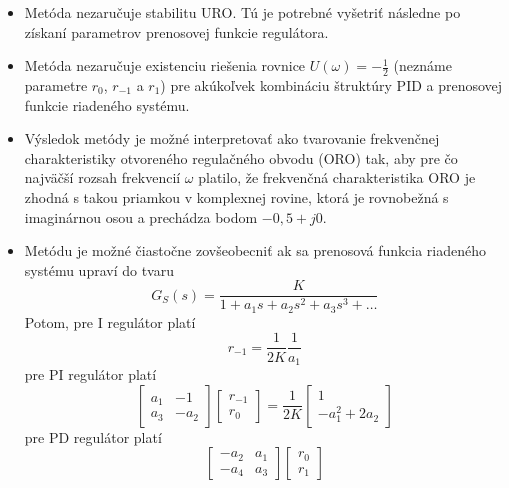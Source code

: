 \documentclass[a4paper, 10pt, ]{article}
\begin{document}
\begin{itemize}[leftmargin=0pt, labelsep=3mm, itemsep=0pt]
    \item Metóda nezaručuje stabilitu URO. Tú je potrebné vyšetriť následne po získaní parametrov prenosovej funkcie regulátora.
    \item Metóda nezaručuje existenciu riešenia rovnice $U(\omega) = -\frac{1}{2}$ (neznáme parametre  $r_0$, $r_{-1}$ a $r_1$) pre akúkoľvek kombináciu štruktúry PID a prenosovej funkcie riadeného systému.
    \item Výsledok metódy je možné interpretovať ako tvarovanie frekvenčnej charakteristiky otvoreného regulačného obvodu (ORO) tak, aby pre čo najväčší rozsah frekvencií $\omega$ platilo, že frekvenčná charakteristika ORO je zhodná s takou priamkou v komplexnej rovine, ktorá je rovnobežná s imaginárnou osou a prechádza bodom $-0,5 + j0$.
    \item Metódu je možné čiastočne zovšeobecniť ak sa prenosová funkcia riadeného systému upraví do tvaru
    \begin{equation}
        G_S(s) = \frac{K}{1 + a_1s + a_2s^2 + a_3s^3 + \ldots}
    \end{equation}
    Potom, pre I regulátor platí
    \begin{equation}
        r_{-1} = \frac{1}{2K} \frac{1}{a_1}
    \end{equation}
    pre PI regulátor platí
    \begin{equation}
        \begin{bmatrix}
            a_1 & -1 \\ a_3 & -a_2
        \end{bmatrix}
        \begin{bmatrix}
            r_{-1} \\ r_0
        \end{bmatrix}
        =
        \frac{1}{2K}
        \begin{bmatrix}
            1 \\ -a_1^2 + 2 a_2
        \end{bmatrix}
    \end{equation}
    pre PD regulátor platí
    \begin{equation}
        \begin{bmatrix}
            -a_2 & a_1 \\ -a_4 & a_3
        \end{bmatrix}
        \begin{bmatrix}
            r_{0} \\ r_1

\end{bmatrix}
\end{equation}
\end{itemize}
\end{document}

